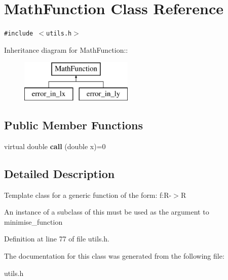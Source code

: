 \section{Math\-Function Class Reference}
\label{classMathFunction}
{\tt \#include $<$utils.h$>$}

Inheritance diagram for Math\-Function::\begin{figure}[H]
\begin{center}
\leavevmode
\includegraphics[height=2cm]{classMathFunction}
\end{center}
\end{figure}
\subsection*{Public Member Functions}
\begin{CompactItemize}
\item 
virtual double \textbf{call} (double x)=0\label{classMathFunction_5c0978bd3e24e8647784eed17f11e25d}

\end{CompactItemize}


\subsection{Detailed Description}
Template class for a generic function of the form: f:R-$>$R

An instance of a subclass of this must be used as the argument to minimise\_\-function 



Definition at line 77 of file utils.h.

The documentation for this class was generated from the following file:\begin{CompactItemize}
\item 
utils.h\end{CompactItemize}
